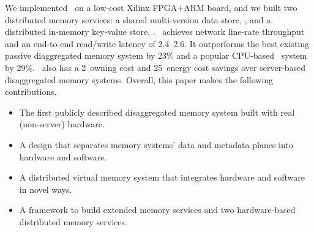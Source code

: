 We implemented \sys\ on a low-cost Xilinx FPGA+ARM board,
and we built %
two distributed memory services: a shared multi-version data store, {\em \sysmv},
and a distributed in-memory key-value store, {\em \syskv}.
\sys\ achieves network line-rate throughput 
and an end-to-end read/write latency of 2.4--2.6\mus.
It outperforms the best existing passive diaggregated memory system by 23\%
and a popular CPU-based \sadm\ system by 29\%.
\sys\ also has a 2\x\ owning cost and 25\x\ energy cost savings over server-based disaggregated memory systems.
Overall, this paper makes the following contributions.

\begin{itemize}

\item The first publicly described disaggregated memory system built with real (non-server) hardware.

\item A design that separates memory systems' data and metadata planes into hardware and software.

\item A distributed virtual memory system that integrates hardware and software in novel ways.


\item A framework to build extended memory services %
and two hardware-based distributed memory services.


\end{itemize}

